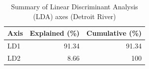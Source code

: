 \begin{table}[htbp]
  \centering
  \caption{Summary of Linear Discriminant Analysis (LDA) axes (Detroit River)}
  \label{tab:dr_03_LDA_Classification_lda_axes_summary}
  \begin{tabular}{lrr}
    \toprule
    Axis & Explained (\%) & Cumulative (\%) \\
    \midrule
    LD1 & 91.34 & 91.34 \\
    LD2 & 8.66 & 100 \\
    \bottomrule
  \end{tabular}
\end{table}
